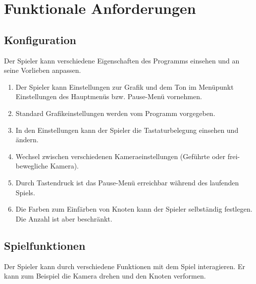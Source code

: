 \chapter{Funktionale Anforderungen}


\renewcommand{\theenumi}{/F\_\arabic{enumi}0/}
\renewcommand{\labelenumi}{\theenumi}



\section{Konfiguration}
Der Spieler kann verschiedene Eigenschaften des Programms einsehen und an seine Vorlieben anpassen.
\begin{enumerate}
 
\item Der Spieler kann Einstellungen zur Grafik und dem Ton im Menüpunkt Einstellungen des Hauptmenüs bzw. Pause-Menü vornehmen.
\item Standard Grafikeinstellungen werden vom Programm vorgegeben.
\item In den Einstellungen kann der Spieler die Tastaturbelegung einsehen und  ändern.
\item Wechsel zwischen verschiedenen Kameraeinstellungen (Geführte oder frei-bewegliche Kamera).  
\item Durch Tastendruck ist das Pause-Menü erreichbar während des laufenden Spiels.
\item Die Farben zum Einfärben von Knoten kann der Spieler selbständig festlegen. Die Anzahl ist aber beschränkt.

\end{enumerate}

\section{Spielfunktionen}
Der Spieler kann durch verschiedene Funktionen mit dem Spiel interagieren. Er kann zum Beispiel die Kamera drehen und den Knoten verformen. 

